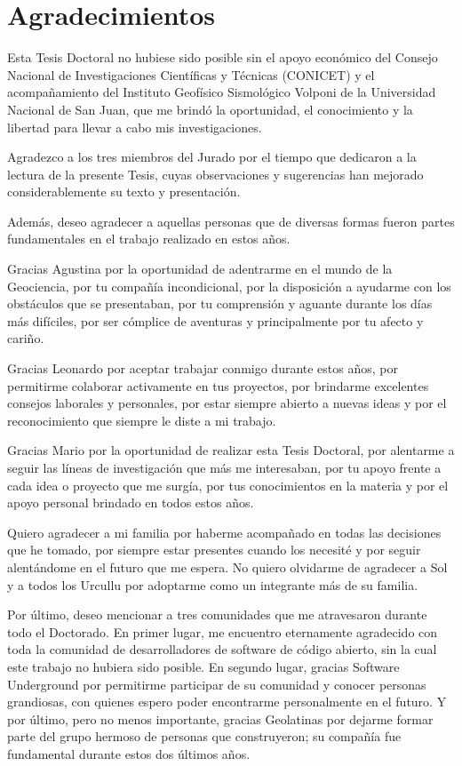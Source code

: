 \chapter*{Agradecimientos}

Esta Tesis Doctoral no hubiese sido posible sin el apoyo económico del Consejo
Nacional de Investigaciones Científicas y Técnicas (CONICET) y el
acompañamiento del Instituto Geofísico Sismológico Volponi de la Universidad
Nacional de San Juan, que me brindó la oportunidad, el conocimiento y la
libertad para llevar a cabo mis investigaciones.

Agradezco a los tres miembros del Jurado por el tiempo que dedicaron a la
lectura de la presente Tesis, cuyas observaciones y sugerencias han mejorado
considerablemente su texto y presentación.

Además, deseo agradecer a aquellas personas que de diversas formas fueron
partes fundamentales en el trabajo realizado en estos años.

Gracias Agustina por la oportunidad de adentrarme en el mundo de la Geociencia,
por tu compañía incondicional, por la disposición a ayudarme con los obstáculos
que se presentaban, por tu comprensión y aguante durante los días más
difíciles, por ser cómplice de aventuras y principalmente por tu afecto
y cariño.

Gracias Leonardo por aceptar trabajar conmigo durante estos años, por
permitirme colaborar activamente en tus proyectos, por brindarme excelentes
consejos laborales y personales, por estar siempre abierto a nuevas ideas y por
el reconocimiento que siempre le diste a mi trabajo.

Gracias Mario por la oportunidad de realizar esta Tesis Doctoral, por alentarme
a seguir las líneas de investigación que más me interesaban, por tu apoyo
frente a cada idea o proyecto que me surgía, por tus conocimientos en la
materia y por el apoyo personal brindado en todos estos años.

Quiero agradecer a mi familia por haberme acompañado en todas las decisiones
que he tomado, por siempre estar presentes cuando los necesité y por seguir
alentándome en el futuro que me espera.
No quiero olvidarme de agradecer a Sol y a todos los Urcullu por adoptarme como
un integrante más de su familia.

Por último, deseo mencionar a tres comunidades que me atravesaron durante todo
el Doctorado.
En primer lugar, me encuentro eternamente agradecido con toda la comunidad de
desarrolladores de software de código abierto, sin la cual este trabajo no
hubiera sido posible.
En segundo lugar, gracias Software Underground por permitirme participar de su
comunidad y conocer personas grandiosas, con quienes espero poder encontrarme
personalmente en el futuro.
Y por último, pero no menos importante, gracias Geolatinas por dejarme formar
parte del grupo hermoso de personas que construyeron; su compañía fue
fundamental durante estos dos últimos años.
